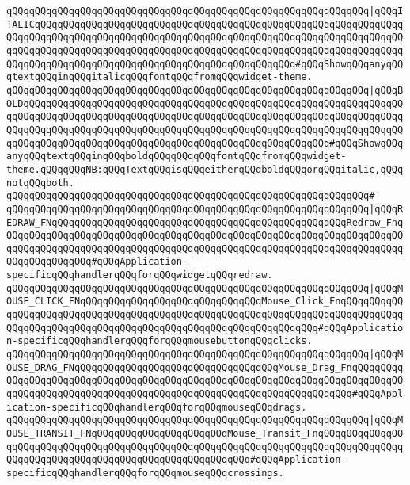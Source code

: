 \verb|qQQqqQQqqQQqqQQqqQQqqQQqqQQqqQQqqQQqqQQqqQQqqQQqqQQqqQQqqQQqqQQq|\verb#|qQQqITALICqQQqqQQqqQQqqQQqqQQqqQQqqQQqqQQqqQQqqQQqqQQqqQQqqQQqqQQqqQQqqQQqqQQqqQQqqQQqqQQqqQQqqQQqqQQqqQQqqQQqqQQqqQQqqQQqqQQqqQQqqQQqqQQqqQQqqQQqqQQqqQQqqQQqqQQqqQQqqQQqqQQqqQQqqQQqqQQqqQQqqQQqqQQqqQQqqQQqqQQqqQQqqQQqqQQqqQQqqQQqqQQqqQQqqQQqqQQqqQQqqQQqqQQqqQQqqQQq#\verb|#qQQqShowqQQqanyqQQqtextqQQqinqQQqitalicqQQqfontqQQqfromqQQqwidget-theme.|\newline
\verb|qQQqqQQqqQQqqQQqqQQqqQQqqQQqqQQqqQQqqQQqqQQqqQQqqQQqqQQqqQQqqQQq|\verb#|qQQqBOLDqQQqqQQqqQQqqQQqqQQqqQQqqQQqqQQqqQQqqQQqqQQqqQQqqQQqqQQqqQQqqQQqqQQqqQQqqQQqqQQqqQQqqQQqqQQqqQQqqQQqqQQqqQQqqQQqqQQqqQQqqQQqqQQqqQQqqQQqqQQqqQQqqQQqqQQqqQQqqQQqqQQqqQQqqQQqqQQqqQQqqQQqqQQqqQQqqQQqqQQqqQQqqQQqqQQqqQQqqQQqqQQqqQQqqQQqqQQqqQQqqQQqqQQqqQQqqQQqqQQqqQQq#\verb|#qQQqShowqQQqanyqQQqtextqQQqinqQQqboldqQQqqQQqqQQqfontqQQqfromqQQqwidget-theme.qQQqqQQqNB:qQQqTextqQQqisqQQqeitherqQQqboldqQQqorqQQqitalic,qQQqnotqQQqboth.|\newline
\verb|qQQqqQQqqQQqqQQqqQQqqQQqqQQqqQQqqQQqqQQqqQQqqQQqqQQqqQQqqQQqqQQq#|\newline
\verb|qQQqqQQqqQQqqQQqqQQqqQQqqQQqqQQqqQQqqQQqqQQqqQQqqQQqqQQqqQQqqQQq|\verb#|qQQqREDRAW_FNqQQqqQQqqQQqqQQqqQQqqQQqqQQqqQQqqQQqqQQqqQQqqQQqqQQqRedraw_FnqQQqqQQqqQQqqQQqqQQqqQQqqQQqqQQqqQQqqQQqqQQqqQQqqQQqqQQqqQQqqQQqqQQqqQQqqQQqqQQqqQQqqQQqqQQqqQQqqQQqqQQqqQQqqQQqqQQqqQQqqQQqqQQqqQQqqQQqqQQqqQQqqQQqqQQqqQQq#\verb|#qQQqApplication-specificqQQqhandlerqQQqforqQQqwidgetqQQqredraw.|\newline
\verb|qQQqqQQqqQQqqQQqqQQqqQQqqQQqqQQqqQQqqQQqqQQqqQQqqQQqqQQqqQQqqQQq|\verb#|qQQqMOUSE_CLICK_FNqQQqqQQqqQQqqQQqqQQqqQQqqQQqqQQqMouse_Click_FnqQQqqQQqqQQqqQQqqQQqqQQqqQQqqQQqqQQqqQQqqQQqqQQqqQQqqQQqqQQqqQQqqQQqqQQqqQQqqQQqqQQqqQQqqQQqqQQqqQQqqQQqqQQqqQQqqQQqqQQqqQQqqQQqqQQqqQQq#\verb|#qQQqApplication-specificqQQqhandlerqQQqforqQQqmousebuttonqQQqclicks.|\newline
\verb|qQQqqQQqqQQqqQQqqQQqqQQqqQQqqQQqqQQqqQQqqQQqqQQqqQQqqQQqqQQqqQQq|\verb#|qQQqMOUSE_DRAG_FNqQQqqQQqqQQqqQQqqQQqqQQqqQQqqQQqqQQqMouse_Drag_FnqQQqqQQqqQQqqQQqqQQqqQQqqQQqqQQqqQQqqQQqqQQqqQQqqQQqqQQqqQQqqQQqqQQqqQQqqQQqqQQqqQQqqQQqqQQqqQQqqQQqqQQqqQQqqQQqqQQqqQQqqQQqqQQqqQQqqQQqqQQq#\verb|#qQQqApplication-specificqQQqhandlerqQQqforqQQqmouseqQQqdrags.|\newline
\verb|qQQqqQQqqQQqqQQqqQQqqQQqqQQqqQQqqQQqqQQqqQQqqQQqqQQqqQQqqQQqqQQq|\verb#|qQQqMOUSE_TRANSIT_FNqQQqqQQqqQQqqQQqqQQqqQQqMouse_Transit_FnqQQqqQQqqQQqqQQqqQQqqQQqqQQqqQQqqQQqqQQqqQQqqQQqqQQqqQQqqQQqqQQqqQQqqQQqqQQqqQQqqQQqqQQqqQQqqQQqqQQqqQQqqQQqqQQqqQQqqQQqqQQqqQQq#\verb|#qQQqApplication-specificqQQqhandlerqQQqforqQQqmouseqQQqcrossings.|\newline
